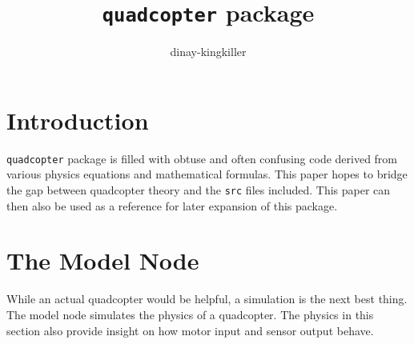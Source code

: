 \documentclass[lettersize,journal]{IEEEtran}
\begin{document}
\title{\texttt{quadcopter} package}
\author{dinay-kingkiller}

\maketitle


\section{Introduction}
 \texttt{quadcopter} package is filled with obtuse and often confusing code derived from various physics equations and mathematical formulas.
This paper hopes to bridge the gap between quadcopter theory and the \texttt{src} files included.
This paper can then also be used as a reference for later expansion of this package.

\section{The Model Node}
While an actual quadcopter would be helpful, a simulation is the next best thing.
The model node simulates the physics of a quadcopter.
The physics in this section also provide insight on how motor input and sensor output behave.
\end{document}
